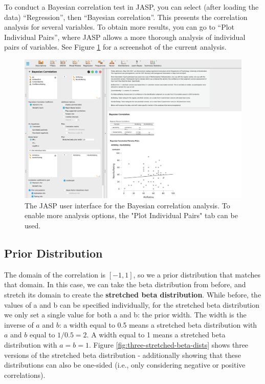 \documentclass[
]{book}
\begin{document}
To conduct a Bayesian correlation test in JASP, you can select (after loading the data) ``Regression'', then ``Bayesian correlation''. This presents the correlation analysis for several variables. To obtain more results, you can go to ``Plot Individual Pairs'', where JASP allows a more thorough analysis of individual pairs of variables. See Figure \ref{fig:beer-tastiness-correlation-JASP} for a screenshot of the current analysis.

\begin{figure}

{\centering \includegraphics[width=0.9\linewidth]{Figures/correlationTestJASPpanel2022} 

}

\caption{The JASP user interface for the Bayesian correlation analysis. To enable more analysis options, the "Plot Individual Pairs" tab can be used.}\label{fig:beer-tastiness-correlation-JASP}
\end{figure}

\hypertarget{prior-distribution-1}{%
\subsection{Prior Distribution}\label{prior-distribution-1}}

The domain of the correlation is \([-1, 1]\), so we a prior distribution that matches that domain. In this case, we can take the beta distribution from before, and stretch its domain to create the \textbf{stretched beta distribution}. While before, the values of a and b can be specified individually, for the stretched beta distribution we only set a single value for both a and b: the prior width. The width is the inverse of \(a\) and \(b\): a width equal to 0.5 means a stretched beta distribution with \(a\) and \(b\) equal to \(1 / 0.5 = 2\). A width equal to 1 means a stretched beta distribution with \(a = b = 1\). Figure \ref{fig:three-stretched-beta-dists} shows three versions of the stretched beta distribution - additionally showing that these distributions can also be one-sided (i.e., only considering negative or positive correlations).
\end{document}
